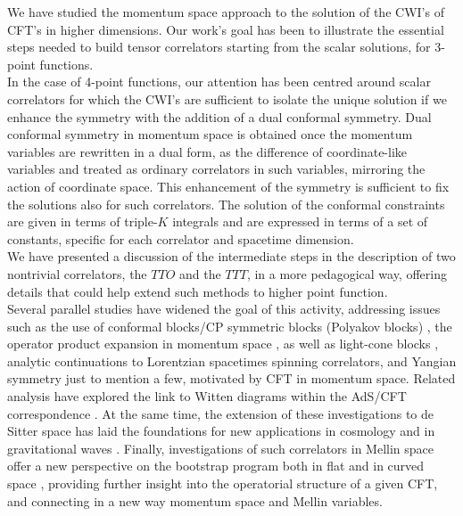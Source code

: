 \documentclass[a4paper,11pt,openright,twoside]{book}
\numberwithin{equation}{section}
\begin{document}
{{We have studied the momentum space approach to the solution of the CWI's of CFT's in higher dimensions. Our work's goal has been to illustrate the essential steps needed to build tensor correlators starting from the scalar solutions, for 3-point functions. \\
In the case of 4-point functions, our attention has been centred around scalar correlators for which the CWI's are sufficient to isolate the unique solution if we enhance the symmetry with the addition of a dual conformal symmetry. Dual conformal symmetry in momentum space is obtained once the momentum variables are rewritten in a dual form, as the difference of coordinate-like variables and treated as ordinary correlators in such variables, mirroring the action of coordinate space. This enhancement of the symmetry is sufficient to fix the solutions also for such correlators.    
The solution of the conformal constraints are given in terms of triple-$K$ integrals and are expressed in terms of a set of constants, specific for each correlator and spacetime dimension.\\
We have presented a discussion of the intermediate steps in the description of two nontrivial correlators, the $TTO$ and the $TTT$, in a more pedagogical way, offering details that could help extend such methods to higher point function.\\ 
Several parallel studies have widened the goal of this activity, addressing issues such as the use of conformal blocks/CP symmetric blocks (Polyakov blocks) \cite{Isono:2019ihz,Isono:2018rrb,Isono:2019wex} \cite{Chen:2019gka}, the operator product expansion in momentum space \cite{Gillioz:2019iye}, as well as light-cone blocks \cite{Gillioz:2019lgs, Gillioz:2018mto,Gillioz:2018kwh}, analytic continuations to Lorentzian spacetimes \cite{Bautista:2019qxj} spinning correlators, and Yangian symmetry \cite{Loebbert:2020hxk,Loebbert:2016cdm} just to mention a few, motivated by CFT in momentum space. Related analysis have explored the link to Witten diagrams within the AdS/CFT correspondence \cite{Anand:2019lkt,Albayrak:2019yve}. At the same time, the extension of these investigations to de Sitter space has laid the foundations for new applications in cosmology \cite{Maldacena:2011nz, Arkani-Hamed:2018kmz,Baumann:2019oyu,Arkani-Hamed:2017fdk,Benincasa:2019vqr,Benincasa:2018ssx} \cite{Kundu:2014gxa,Almeida:2017lrq,Baumann:2020dch} and in gravitational waves \cite{Almeida:2019hhx}. Finally, investigations of such correlators in Mellin space \cite{Penedones:2010ue,Fitzpatrick:2011ia} \cite{Gopakumar:2016cpb,Gopakumar:2016wkt} offer a new perspective on the bootstrap program both in flat and in curved space \cite{Sleight:2019mgd,Sleight:2019hfp}, providing further insight into the operatorial structure of a given CFT, and connecting in a new way momentum space and Mellin variables.  \\
}}
\end{document}
